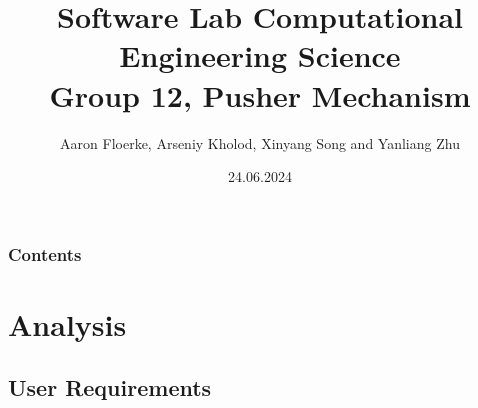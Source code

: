 \documentclass[ucs,10pt]{beamer}
\begin{document}
\title[{\tt info@stce.rwth-aachen.de}]{\textcolor{rwth-blue}{Software Lab Computational Engineering Science} \vspace{.2cm} \\ {\small Group 12, Pusher Mechanism}}
\author[Group 12)]{Aaron Floerke, Arseniy Kholod, Xinyang Song and Yanliang Zhu} 
\date[]{24.06.2024}



\begin{frame}[plain]
\titlepage
\end{frame}

\begin{frame}
	\frametitle{Contents}
\tableofcontents
\end{frame}



\section{Analysis}

\subsection{User Requirements}
\end{document}

